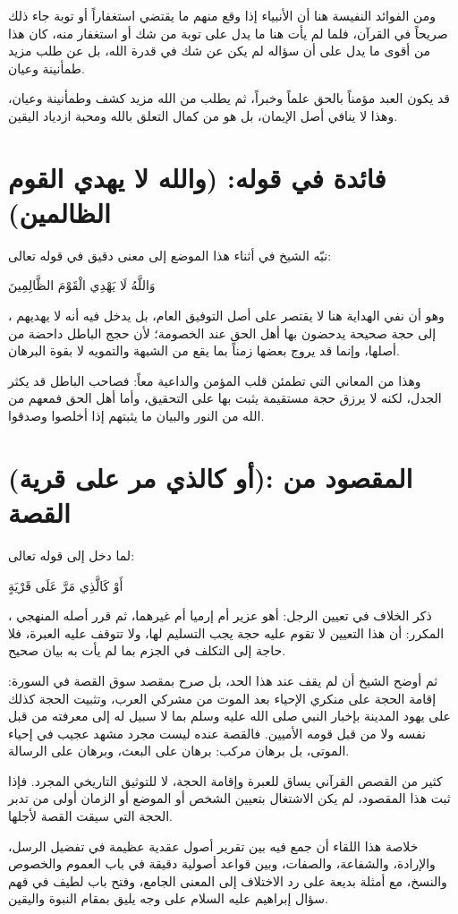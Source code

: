ومن الفوائد النفيسة هنا أن الأنبياء إذا وقع منهم ما يقتضي استغفاراً أو توبة جاء ذلك صريحاً في القرآن، فلما لم يأت هنا ما يدل على توبة من شك أو استغفار منه، كان هذا من أقوى ما يدل على أن سؤاله لم يكن عن شك في قدرة الله، بل عن طلب مزيد طمأنينة وعيان.

\begin{fawaid}
قد يكون العبد مؤمناً بالحق علماً وخبراً، ثم يطلب من الله مزيد كشف وطمأنينة وعيان، وهذا لا ينافي أصل الإيمان، بل هو من كمال التعلق بالله ومحبة ازدياد اليقين.
\end{fawaid}

\section{فائدة في قوله: (والله لا يهدي القوم الظالمين)}
نبّه الشيخ في أثناء هذا الموضع إلى معنى دقيق في قوله تعالى: \begin{ayah}وَاللَّهُ لَا يَهْدِي الْقَوْمَ الظَّالِمِينَ\end{ayah}، وهو أن نفي الهداية هنا لا يقتصر على أصل التوفيق العام، بل يدخل فيه أنه لا يهديهم إلى حجة صحيحة يدحضون بها أهل الحق عند الخصومة؛ لأن حجج الباطل داحضة من أصلها، وإنما قد يروج بعضها زمناً بما يقع من الشبهة والتمويه لا بقوة البرهان.

وهذا من المعاني التي تطمئن قلب المؤمن والداعية معاً: فصاحب الباطل قد يكثر الجدل، لكنه لا يرزق حجة مستقيمة يثبت بها على التحقيق، وأما أهل الحق فمعهم من الله من النور والبيان ما يثبتهم إذا أخلصوا وصدقوا.

\section{(أو كالذي مر على قرية): المقصود من القصة}
لما دخل  إلى قوله تعالى: \begin{ayah}أَوْ كَالَّذِي مَرَّ عَلَى قَرْيَةٍ\end{ayah}، ذكر الخلاف في تعيين الرجل: أهو عزير أم إرميا أم غيرهما، ثم قرر أصله المنهجي المكرر: أن هذا التعيين لا تقوم عليه حجة يجب التسليم لها، ولا تتوقف عليه العبرة، فلا حاجة إلى التكلف في الجزم بما لم يأت به بيان صحيح.

ثم أوضح الشيخ أن  لم يقف عند هذا الحد، بل صرح بمقصد سوق القصة في السورة: إقامة الحجة على منكري الإحياء بعد الموت من مشركي العرب، وتثبيت الحجة كذلك على يهود المدينة بإخبار النبي صلى الله عليه وسلم بما لا سبيل له إلى معرفته من قبل نفسه ولا من قبل قومه الأميين. فالقصة عنده ليست مجرد مشهد عجيب في إحياء الموتى، بل برهان مركب: برهان على البعث، وبرهان على الرسالة.

\begin{fawaid}
كثير من القصص القرآني يساق للعبرة وإقامة الحجة، لا للتوثيق التاريخي المجرد. فإذا ثبت هذا المقصود، لم يكن الاشتغال بتعيين الشخص أو الموضع أو الزمان أولى من تدبر الحجة التي سيقت القصة لأجلها.
\end{fawaid}

\separator

خلاصة هذا اللقاء أن  جمع فيه بين تقرير أصول عقدية عظيمة في تفضيل الرسل، والإرادة، والشفاعة، والصفات، وبين قواعد أصولية دقيقة في باب العموم والخصوص والنسخ، مع أمثلة بديعة على رد الاختلاف إلى المعنى الجامع، وفتح باب لطيف في فهم سؤال إبراهيم عليه السلام على وجه يليق بمقام النبوة واليقين.
